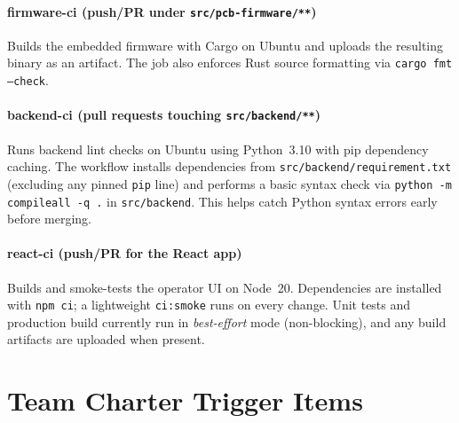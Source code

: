 \documentclass{article}
\begin{document}
\paragraph{firmware-ci (push/PR under \texttt{src/pcb-firmware/**})}
Builds the embedded firmware with Cargo on Ubuntu and uploads the resulting binary as an artifact.
The job also enforces Rust source formatting via \texttt{cargo fmt --check}.

\paragraph{backend-ci (pull requests touching \texttt{src/backend/**})}
Runs backend lint checks on Ubuntu using Python~3.10 with pip dependency caching. The workflow installs dependencies from \texttt{src/backend/requirement.txt} (excluding any pinned \texttt{pip} line) and performs a basic syntax check via \texttt{python -m compileall -q .} in \texttt{src/backend}. This helps catch Python syntax errors early before merging.

\paragraph{react-ci (push/PR for the React app)}
Builds and smoke-tests the operator UI on Node~20. Dependencies are installed
with \texttt{npm ci}; a lightweight \texttt{ci:smoke} runs on every change.
Unit tests and production build currently run in \emph{best-effort} mode
(non-blocking), and any build artifacts are uploaded when present.

\section{Team Charter Trigger Items}
\end{document}
